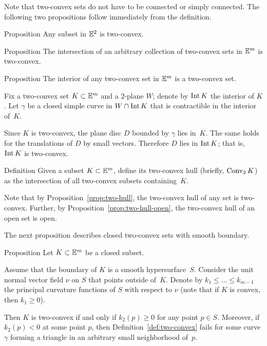 Note that two-convex sets do not have to be connected or simply connected. 
The following two propositions follow immediately from the definition.

\begin{thm}{Proposition}
Any subset in $\mathbb{E}^2$ is two-convex.
\end{thm}


\begin{thm}{Proposition}\label{prop:two-hull}
The intersection of an arbitrary collection of two-convex sets in $\mathbb{E}^m$ is two-convex.
\end{thm}

\begin{thm}{Proposition}\label{prop:two-hull-open}
The interior of any two-convex set in $\mathbb{E}^m$ is a two-convex set.
\end{thm}

Fix a  two-convex set $K\subset \EE^m$ and a 2-plane $W$;
denote by \index{$\Int$}$\mathop{\rm Int}\nolimits K$ the interior of $K$.
Let $\gamma$ be a closed simple curve in $W\cap \Int K$ 
that  is contractible in the interior of~$K$.

Since $K$ is two-convex,
the plane disc $D$ bounded by $\gamma$ lies in~$K$.
The same holds for the translations of $D$ by small vectors.
Therefore $D$ lies in $\mathop{\rm Int}\nolimits K$;
that is, $\mathop{\rm Int}\nolimits K$ is two-convex.
\qeds

\begin{thm}{Definition}
Given a subset $K\subset \EE^m$, define its two-convex hull (briefly, $\mathop{\rm Conv}\nolimits_2K$) as the intersection of all two-convex subsets containing~$K$.
\end{thm}

Note that by Proposition~\ref{prop:two-hull},
the two-convex hull of any set is two-convex.
Further, 
by Proposition~\ref{prop:two-hull-open}, the
two-convex hull of an open set is open.

The next proposition describes  closed two-convex sets with smooth boundary.

\begin{thm}{Proposition}\label{prop:two-cove+smooth}
Let $K\subset \EE^m$ be a closed subset.

Assume that the boundary of $K$ is a smooth hypersurface~$S$.
Consider the unit normal vector field $\nu$ on $S$ that  points outside of~$K$.
Denote by $k_1\le \dots\le k_{m-1}$ the principal curvature functions of $S$ with respect to $\nu$ (note that if $K$ is convex, then  $k_1\ge 0$).

Then $K$ is two-convex if and only if $k_2(p)\ge 0$ for any point $p\in S$.
Moreover, if $k_2(p)<0$ at some point $p$, then Definition~\ref{def:two-convex} fails for some curve $\gamma$ forming a triangle in an arbitrary small neighborhood of~$p$.
\end{thm}

